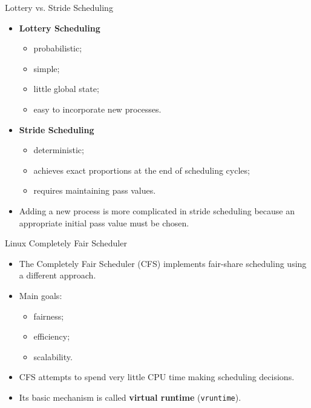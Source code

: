 \begin{frame}{Lottery vs. Stride Scheduling}
    \begin{itemize}
        \item \textbf{Lottery Scheduling}
        \begin{itemize}
            \item probabilistic;
            \item simple;
            \item little global state;
            \item easy to incorporate new processes.
        \end{itemize}

        \item \textbf{Stride Scheduling}
        \begin{itemize}
            \item deterministic;
            \item achieves exact proportions at the end of scheduling cycles;
            \item requires maintaining pass values.
        \end{itemize}

        \item Adding a new process is more complicated in stride scheduling
        because an appropriate initial pass value must be chosen.
    \end{itemize}
\end{frame}


\begin{frame}{Linux Completely Fair Scheduler}
    \begin{itemize}
        \item The Completely Fair Scheduler (CFS) implements fair-share scheduling
        using a different approach.
        \item Main goals:
        \begin{itemize}
            \item fairness;
            \item efficiency;
            \item scalability.
        \end{itemize}
        \item CFS attempts to spend very little CPU time making scheduling decisions.
        \item Its basic mechanism is called \textbf{virtual runtime}
        (\texttt{vruntime}).
    \end{itemize}
\end{frame}

